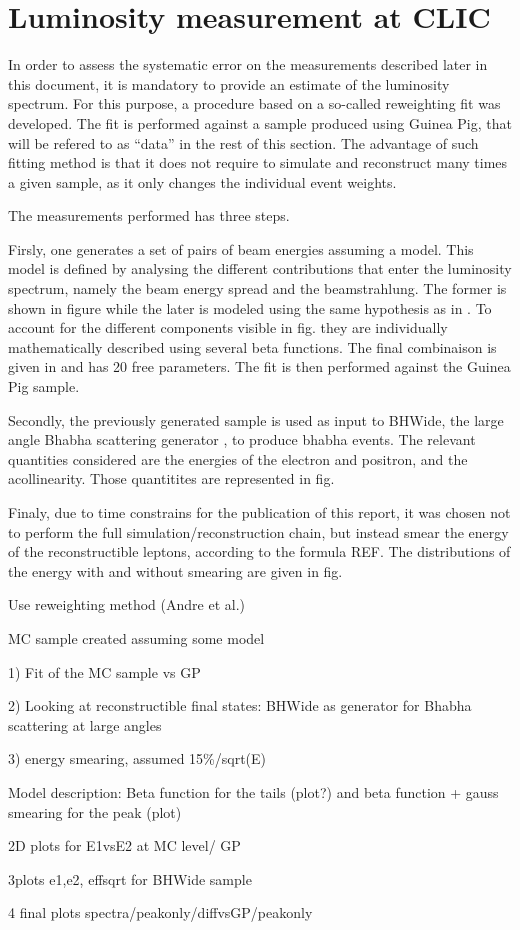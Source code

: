\documentclass{article}
\begin{document}
\section{Luminosity measurement at CLIC}
In order to assess the systematic error on the measurements described later in
this document, it is mandatory to provide an estimate of the luminosity
spectrum. For this purpose, a procedure based on a so-called reweighting fit \cite{andre}
was developed. The fit is performed against a sample produced using Guinea
Pig\cite{guineaspig}, that will be refered to as ``data'' in the rest of this
section. The advantage of such fitting method is that it does not require to
simulate and reconstruct many times a given sample, as it only changes the individual event weights.

The measurements performed has three steps. 

Firsly, one generates a set of pairs of beam energies assuming a model.
  This model is defined by analysing the different contributions that enter the
  luminosity spectrum, namely the beam energy spread and the beamstrahlung. The
  former is shown in figure while the later is modeled using the same hypothesis
  as in \cite{andre}. To account for the different components visible in fig.
  they are individually mathematically described using several beta functions.
  The final combinaison is given in \cite{lumimeas_toappear} and has 20 free
  parameters. The fit is then performed against the Guinea Pig sample. 
  
Secondly, the previously generated sample is used as input to BHWide,
  the large angle Bhabha scattering generator \cite{bhwide}, to produce bhabha
  events. The relevant quantities considered are the energies of the electron
  and positron, and the acollinearity. Those quantitites are represented in fig. 
  
Finaly, due to time constrains for the publication of this report, it
  was chosen not to perform the full simulation/reconstruction chain, but
  instead smear the energy of the reconstructible leptons, according to the
  formula REF. The distributions of the energy with and without smearing are
  given in fig.


 Use reweighting method (Andre et al.) 

MC sample created assuming some model

1) Fit of the MC sample vs GP

2) Looking at reconstructible final states: BHWide as generator for Bhabha
scattering at large angles

3) energy smearing, assumed 15\%/sqrt(E) 

Model description: Beta function for the tails (plot?) and beta function + gauss
smearing for the peak (plot)

2D plots for E1vsE2 at MC level/ GP

3plots e1,e2, effsqrt for BHWide sample

4 final plots spectra/peakonly/diffvsGP/peakonly



\begin{thebibliography}{99}
\end{thebibliography}
\end{document}
